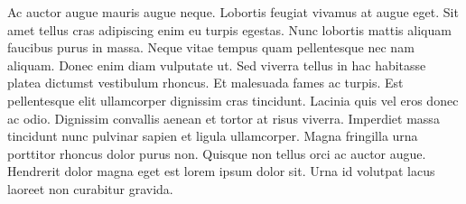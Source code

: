 \documentclass[letterpaper]{article} %
\begin{document}
\begin{NoHyper}
Ac auctor augue mauris augue neque.
Lobortis feugiat vivamus at augue eget.
Sit amet tellus cras adipiscing enim eu turpis egestas.
Nunc lobortis mattis aliquam faucibus purus in massa.
Neque vitae tempus quam pellentesque nec nam aliquam.
Donec enim diam vulputate ut.
Sed viverra tellus in hac habitasse platea dictumst vestibulum rhoncus.
Et malesuada fames ac turpis.
Est pellentesque elit ullamcorper dignissim cras tincidunt.
Lacinia quis vel eros donec ac odio.
Dignissim convallis aenean et tortor at risus viverra.
Imperdiet massa tincidunt nunc pulvinar sapien et ligula ullamcorper.
Magna fringilla urna porttitor rhoncus dolor purus non.
Quisque non tellus orci ac auctor augue.
Hendrerit dolor magna eget est lorem ipsum dolor sit.
Urna id volutpat lacus laoreet non curabitur gravida.



\end{NoHyper}
\end{document}
